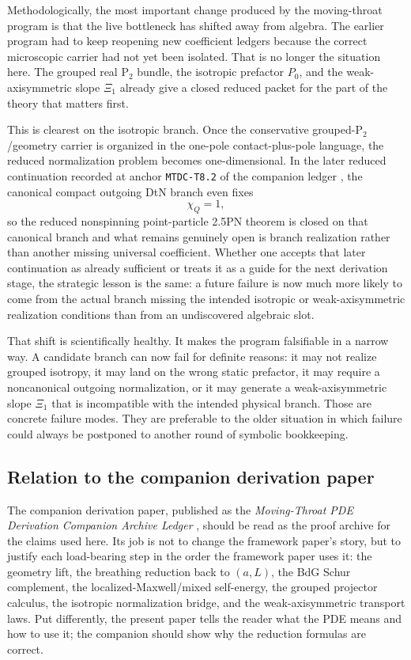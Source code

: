 \documentclass[11pt]{article}
\theoremstyle{definition}
\newcommand{\Ptwo}{\ensuremath{\mathrm{P}_2}}
\newcommand{\XiOne}{\ensuremath{\Xi_1}}
\begin{document}
Methodologically, the most important change produced by the moving-throat program is that the live bottleneck has shifted away from algebra. The earlier program had to keep reopening new coefficient ledgers because the correct microscopic carrier had not yet been isolated. That is no longer the situation here. The grouped real \(\Ptwo\) bundle, the isotropic prefactor \(P_0\), and the weak-axisymmetric slope \(\XiOne\) already give a closed reduced packet for the part of the theory that matters first.

This is clearest on the isotropic branch. Once the conservative grouped-\(\Ptwo\)/geometry carrier is organized in the one-pole contact-plus-pole language, the reduced normalization problem becomes one-dimensional. In the later reduced continuation recorded at anchor \texttt{MTDC-T8.2} of the companion ledger \cite{Norris2026PDELedger}, the canonical compact outgoing DtN branch even fixes
\[
\chi_Q=1,
\]
so the reduced nonspinning point-particle 2.5PN theorem is closed on that canonical branch and what remains genuinely open is branch realization rather than another missing universal coefficient. Whether one accepts that later continuation as already sufficient or treats it as a guide for the next derivation stage, the strategic lesson is the same: a future failure is now much more likely to come from the actual branch missing the intended isotropic or weak-axisymmetric realization conditions than from an undiscovered algebraic slot.

That shift is scientifically healthy. It makes the program falsifiable in a narrow way. A candidate branch can now fail for definite reasons: it may not realize grouped isotropy, it may land on the wrong static prefactor, it may require a noncanonical outgoing normalization, or it may generate a weak-axisymmetric slope \(\XiOne\) that is incompatible with the intended physical branch. Those are concrete failure modes. They are preferable to the older situation in which failure could always be postponed to another round of symbolic bookkeeping.

\subsection{Relation to the companion derivation paper}

The companion derivation paper, published as the \emph{Moving-Throat PDE Derivation Companion Archive Ledger} \cite{Norris2026PDELedger}, should be read as the proof archive for the claims used here. Its job is not to change the framework paper's story, but to justify each load-bearing step in the order the framework paper uses it: the geometry lift, the breathing reduction back to \((a,L)\), the BdG Schur complement, the localized-Maxwell/mixed self-energy, the grouped projector calculus, the isotropic normalization bridge, and the weak-axisymmetric transport laws. Put differently, the present paper tells the reader what the PDE means and how to use it; the companion should show why the reduction formulas are correct.
\end{document}
